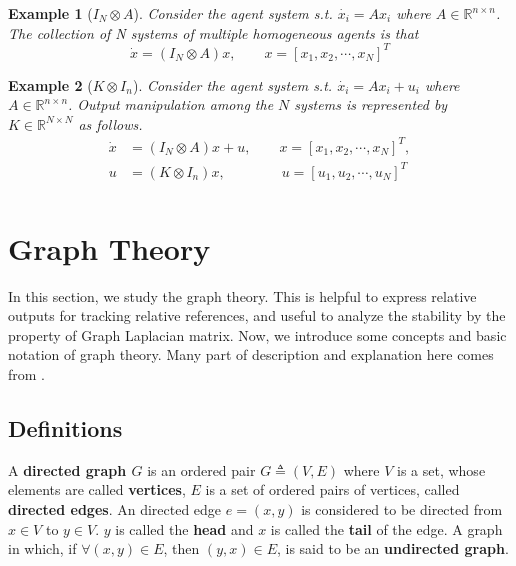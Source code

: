\documentclass[11pt, a4paper, oneside, openany, reqno]{book}
\newtheorem{example}{Example}
\theoremstyle{definition}
\theoremstyle{remark}
\numberwithin{equation}{chapter} %
\newcommand{\R}{\ensuremath{{\mathbb R}}}
\begin{document}
\begin{example}[$ I_N \otimes A $]
	Consider the agent system  s.t. $ \dot{x_i}=Ax_i $ where $ A \in \R^{n \times n} $. 
	The collection of N systems of multiple homogeneous agents is that
	\[ \dot{x}=(I_N \otimes A) x, \qquad x=\left[ x_1,x_2,\cdots,x_N \right]^T \]
\end{example}

\begin{example}[$ K \otimes I_n $]
	Consider the agent system  s.t. $ \dot{x_i}=Ax_i+u_i$ where $ A \in \R^{n \times n}  $.  
	Output manipulation among the $ N $ systems is 
	represented by 
	$ K \in \R^{N \times N} $ as follows.
	\begin{equation*}\begin{split}
	\dot{x}&=(I_N \otimes A) x + u, \qquad x=\left[ x_1,x_2,\cdots,x_N \right]^T, \\
	u&=(K \otimes I_n)x, \qquad\qquad u=\left[ u_1,u_2,\cdots,u_N \right]^T \\
	\end{split}\end{equation*} 
\end{example}


\section{Graph Theory}\label{graphtheory}
In this section, we study the graph theory. 
This is helpful to express relative outputs for tracking relative references, 
and useful to analyze the stability by the property of Graph Laplacian matrix. 
Now, we introduce some concepts and basic notation of graph theory. 
Many part of description and explanation here comes from \cite{diestel, wikigraph}.

\subsection{Definitions}
A \textbf{directed graph $ G $} is an ordered pair $ G \triangleq (V,E) $ 
where $ V $ is a set, whose elements are called \textbf{vertices},
$ E $ is a set of ordered pairs of vertices, called \textbf{directed edges}.
An directed edge $ e = (x,y) $ is considered to be directed from $ x \in V $ to $ y \in V $.
$ y $ is called the \textbf{head} and $ x $ is called the \textbf{tail} of the edge.
A graph in which, if $ \forall (x,y) \in E $, then $ (y,x) \in E $, 
is said to be an \textbf{undirected graph}.
\end{document}
